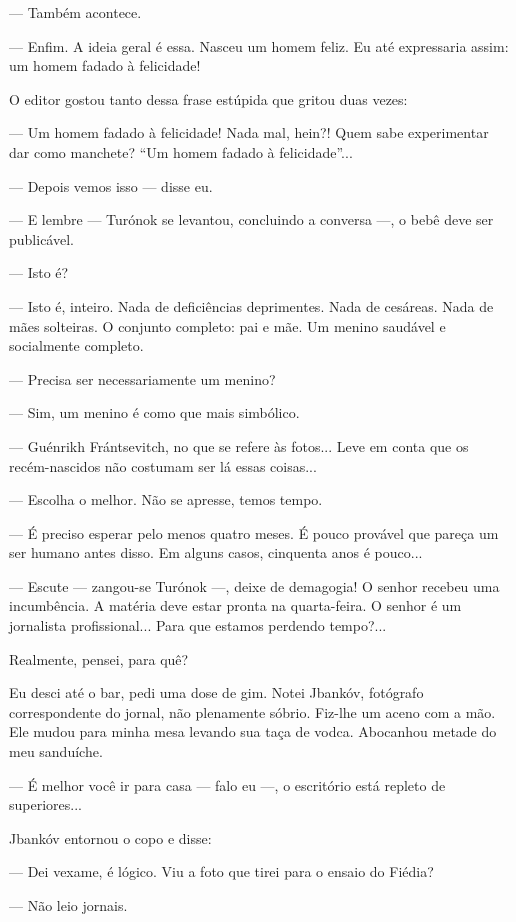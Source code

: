 --- Também acontece.

--- Enfim. A ideia geral é essa. Nasceu um homem feliz. Eu até
expressaria assim: um homem fadado à felicidade!

O editor gostou tanto dessa frase estúpida que gritou duas vezes:

--- Um homem fadado à felicidade! Nada mal, hein?! Quem sabe
experimentar dar como manchete? ``Um homem fadado à felicidade''...

--- Depois vemos isso --- disse eu.

--- E lembre --- Turónok se levantou, concluindo a conversa ---, o bebê
deve ser publicável.

--- Isto é?

--- Isto é, inteiro. Nada de deficiências deprimentes. Nada de cesáreas.
Nada de mães solteiras. O conjunto completo: pai e mãe. Um menino
saudável e socialmente completo.

--- Precisa ser necessariamente um menino?

--- Sim, um menino é como que mais simbólico.

--- Guénrikh Frántsevitch, no que se refere às fotos... Leve em conta
que os recém-nascidos não costumam ser lá essas coisas...

--- Escolha o melhor. Não se apresse, temos tempo.

--- É preciso esperar pelo menos quatro meses. É pouco provável que
pareça um ser humano antes disso. Em alguns casos, cinquenta anos é
pouco...

--- Escute --- zangou-se Turónok ---, deixe de demagogia! O senhor
recebeu uma incumbência. A matéria deve estar pronta na quarta-feira. O
senhor é um jornalista profissional... Para que estamos perdendo
tempo?...

Realmente, pensei, para quê?

Eu desci até o bar, pedi uma dose de gim. Notei Jbankóv, fotógrafo
correspondente do jornal, não plenamente sóbrio. Fiz-lhe um aceno com a
mão. Ele mudou para minha mesa levando sua taça de vodca. Abocanhou
metade do meu sanduíche.

--- É melhor você ir para casa --- falo eu ---, o escritório está
repleto de superiores...

Jbankóv entornou o copo e disse:

--- Dei vexame, é lógico. Viu a foto que tirei para o ensaio do Fiédia?

--- Não leio jornais.

